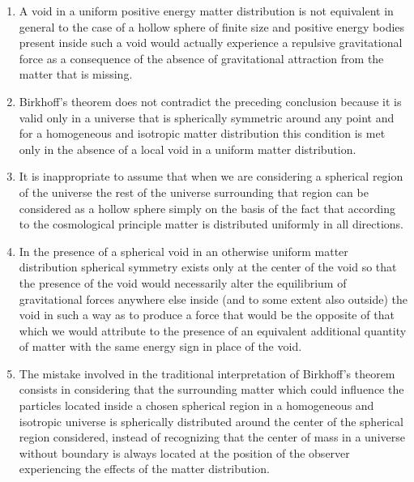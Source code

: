 \documentclass[notitlepage,12pt]{report}
\begin{document}
\begin{enumerate}
\item A void in a uniform positive energy matter distribution is not equivalent in general to the case of a hollow sphere of finite size and positive energy bodies present inside such a void would actually experience a repulsive gravitational force as a consequence of the absence of gravitational attraction from the matter that is missing.

\item Birkhoff's theorem does not contradict the preceding conclusion because it is valid only in a universe that is spherically symmetric around any point and for a homogeneous and isotropic matter distribution this condition is met only in the absence of a local void in a uniform matter distribution.

\item It is inappropriate to assume that when we are considering a spherical region of the universe the rest of the universe surrounding that region can be considered as a hollow sphere simply on the basis of the fact that according to the cosmological principle matter is distributed uniformly in all directions.

\item In the presence of a spherical void in an otherwise uniform matter distribution spherical symmetry exists only at the center of the void so that the presence of the void would necessarily alter the equilibrium of gravitational forces anywhere else inside (and to some extent also outside) the void in such a way as to produce a force that would be the opposite of that which we would attribute to the presence of an equivalent additional quantity of matter with the same energy sign in place of the void.

\item The mistake involved in the traditional interpretation of Birkhoff's theorem consists in considering that the surrounding matter which could influence the particles located inside a chosen spherical region in a homogeneous and isotropic universe is spherically distributed around the center of the spherical region considered, instead of recognizing that the center of mass in a universe without boundary is always located at the position of the observer experiencing the effects of the matter distribution.


\end{enumerate}
\end{document}
